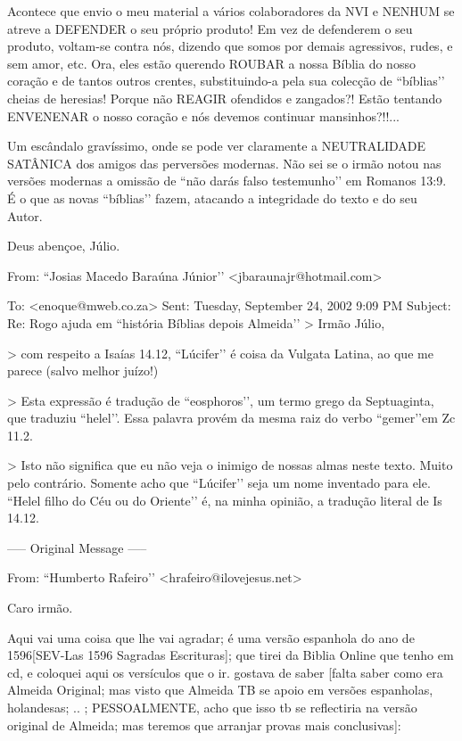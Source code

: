 Acontece que envio o meu material a vários colaboradores da NVI e
NENHUM se atreve a DEFENDER o seu próprio produto! Em vez de
defenderem o seu produto, voltam-se contra nós, dizendo que somos por
demais agressivos, rudes, e sem amor, etc. Ora, eles estão querendo
ROUBAR a nossa Bíblia do nosso coração e de tantos outros crentes,
substituindo-a pela sua colecção de ``bíblias’’ cheias de heresias!
Porque não REAGIR ofendidos e zangados?! Estão tentando ENVENENAR o
nosso coração e nós devemos continuar mansinhos?!!...

Um escândalo gravíssimo, onde se pode ver claramente a NEUTRALIDADE
SATÂNICA dos amigos das perversões modernas. Não sei se o irmão notou
nas versões modernas a omissão de ``não darás falso testemunho’’ em
Romanos 13:9. É o que as novas ``bíblias’’ fazem, atacando a
integridade do texto e do seu Autor.

Deus abençoe, Júlio. 


From: ``Josias Macedo Baraúna Júnior’’ <jbaraunajr@hotmail.com>

To: <enoque@mweb.co.za>
Sent: Tuesday, September 24, 2002 9:09 PM
Subject: Re: Rogo ajuda em ``história Bíblias depois Almeida’’
> Irmão Júlio,

> com respeito a Isaías 14.12, ``Lúcifer’’ é coisa da Vulgata Latina, ao que me parece (salvo melhor juízo!)

> Esta expressão é tradução de ``eosphoros’’, um termo grego da Septuaginta, que traduziu ``helel’’. Essa palavra provém da mesma raiz do verbo ``gemer’’em Zc 11.2.

> Isto não significa que eu não veja o inimigo de nossas almas neste texto. Muito pelo contrário. Somente acho que ``Lúcifer’’ seja um nome inventado para ele. ``Helel filho do Céu ou do Oriente’’ é, na minha opinião, a tradução literal de Is 14.12.

----- Original Message ----- 

From: ``Humberto Rafeiro’’ <hrafeiro@ilovejesus.net>

Caro irmão.

Aqui vai uma coisa que lhe vai agradar; é uma versão espanhola do ano
de 1596[SEV-Las 1596 Sagradas Escrituras]; que tirei da Biblia Online
que tenho em cd, e coloquei aqui os versículos que o ir. gostava de
saber [falta saber como era Almeida Original; mas visto que Almeida TB
se apoio em versões espanholas, holandesas; .. ; PESSOALMENTE, acho
que isso tb se reflectiria na versão original de Almeida; mas teremos
que arranjar provas mais conclusivas]:

